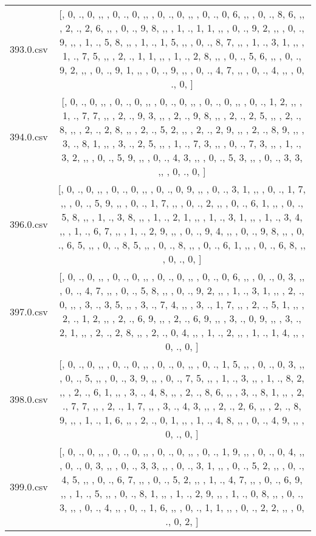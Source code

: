 \begin{table}[ht]
\begin{tabular}{@{}c c@{}}
	393.0.csv & [, 0, ., 0, ,,  , 0, ., 0, ,,  , 0, ., 0, ,,  , 0, ., 0, 6, ,,  , 0, ., 8, 6, ,,  , 2, ., 2, 6, ,,  , 0, ., 9, 8, ,,  , 1, ., 1, 1, ,,  , 0, ., 9, 2, ,,  , 0, ., 9, ,,  , 1, ., 5, 8, ,,  , 1, ., 1, 5, ,,  , 0, ., 8, 7, ,,  , 1, ., 3, 1, ,,  , 1, ., 7, 5, ,,  , 2, ., 1, 1, ,,  , 1, ., 2, 8, ,,  , 0, ., 5, 6, ,,  , 0, ., 9, 2, ,,  , 0, ., 9, 1, ,,  , 0, ., 9, ,,  , 0, ., 4, 7, ,,  , 0, ., 4, ,,  , 0, ., 0, ]\\ 
	394.0.csv & [, 0, ., 0, ,,  , 0, ., 0, ,,  , 0, ., 0, ,,  , 0, ., 0, ,,  , 0, ., 1, 2, ,,  , 1, ., 7, 7, ,,  , 2, ., 9, 3, ,,  , 2, ., 9, 8, ,,  , 2, ., 2, 5, ,,  , 2, ., 8, ,,  , 2, ., 2, 8, ,,  , 2, ., 5, 2, ,,  , 2, ., 2, 9, ,,  , 2, ., 8, 9, ,,  , 3, ., 8, 1, ,,  , 3, ., 2, 5, ,,  , 1, ., 7, 3, ,,  , 0, ., 7, 3, ,,  , 1, ., 3, 2, ,,  , 0, ., 5, 9, ,,  , 0, ., 4, 3, ,,  , 0, ., 5, 3, ,,  , 0, ., 3, 3, ,,  , 0, ., 0, ]\\ 
	396.0.csv & [, 0, ., 0, ,,  , 0, ., 0, ,,  , 0, ., 0, 9, ,,  , 0, ., 3, 1, ,,  , 0, ., 1, 7, ,,  , 0, ., 5, 9, ,,  , 0, ., 1, 7, ,,  , 0, ., 2, ,,  , 0, ., 6, 1, ,,  , 0, ., 5, 8, ,,  , 1, ., 3, 8, ,,  , 1, ., 2, 1, ,,  , 1, ., 3, 1, ,,  , 1, ., 3, 4, ,,  , 1, ., 6, 7, ,,  , 1, ., 2, 9, ,,  , 0, ., 9, 4, ,,  , 0, ., 9, 8, ,,  , 0, ., 6, 5, ,,  , 0, ., 8, 5, ,,  , 0, ., 8, ,,  , 0, ., 6, 1, ,,  , 0, ., 6, 8, ,,  , 0, ., 0, ]\\ 
	397.0.csv & [, 0, ., 0, ,,  , 0, ., 0, ,,  , 0, ., 0, ,,  , 0, ., 0, 6, ,,  , 0, ., 0, 3, ,,  , 0, ., 4, 7, ,,  , 0, ., 5, 8, ,,  , 0, ., 9, 2, ,,  , 1, ., 3, 1, ,,  , 2, ., 0, ,,  , 3, ., 3, 5, ,,  , 3, ., 7, 4, ,,  , 3, ., 1, 7, ,,  , 2, ., 5, 1, ,,  , 2, ., 1, 2, ,,  , 2, ., 6, 9, ,,  , 2, ., 6, 9, ,,  , 3, ., 0, 9, ,,  , 3, ., 2, 1, ,,  , 2, ., 2, 8, ,,  , 2, ., 0, 4, ,,  , 1, ., 2, ,,  , 1, ., 1, 4, ,,  , 0, ., 0, ]\\ 
	398.0.csv & [, 0, ., 0, ,,  , 0, ., 0, ,,  , 0, ., 0, ,,  , 0, ., 1, 5, ,,  , 0, ., 0, 3, ,,  , 0, ., 5, ,,  , 0, ., 3, 9, ,,  , 0, ., 7, 5, ,,  , 1, ., 3, ,,  , 1, ., 8, 2, ,,  , 2, ., 6, 1, ,,  , 3, ., 4, 8, ,,  , 2, ., 8, 6, ,,  , 3, ., 8, 1, ,,  , 2, ., 7, 7, ,,  , 2, ., 1, 7, ,,  , 3, ., 4, 3, ,,  , 2, ., 2, 6, ,,  , 2, ., 8, 9, ,,  , 1, ., 1, 6, ,,  , 2, ., 0, 1, ,,  , 1, ., 4, 8, ,,  , 0, ., 4, 9, ,,  , 0, ., 0, ]\\ 
	399.0.csv & [, 0, ., 0, ,,  , 0, ., 0, ,,  , 0, ., 0, ,,  , 0, ., 1, 9, ,,  , 0, ., 0, 4, ,,  , 0, ., 0, 3, ,,  , 0, ., 3, 3, ,,  , 0, ., 3, 1, ,,  , 0, ., 5, 2, ,,  , 0, ., 4, 5, ,,  , 0, ., 6, 7, ,,  , 0, ., 5, 2, ,,  , 1, ., 4, 7, ,,  , 0, ., 6, 9, ,,  , 1, ., 5, ,,  , 0, ., 8, 1, ,,  , 1, ., 2, 9, ,,  , 1, ., 0, 8, ,,  , 0, ., 3, ,,  , 0, ., 4, ,,  , 0, ., 1, 6, ,,  , 0, ., 1, 1, ,,  , 0, ., 2, 2, ,,  , 0, ., 0, 2, ]\\ 

\end{tabular}
\end{table}
